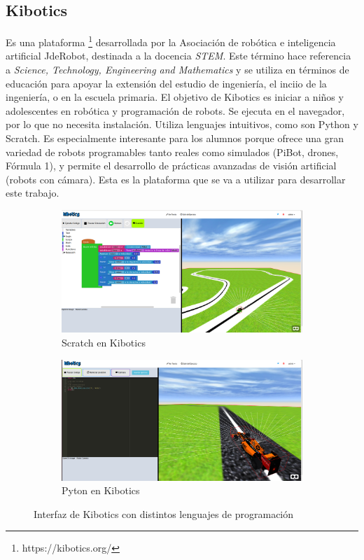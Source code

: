 \documentclass{report}
\begin{document}
\newpage
\subsection{Kibotics} 

Es una plataforma \footnote{https://kibotics.org/} desarrollada por la Asociación de robótica e inteligencia artificial JdeRobot, destinada a la docencia \textit{STEM}. Este término hace referencia a \textit{Science, Technology, Engineering and  Mathematics} y se utiliza en términos de educación para apoyar la extensión del estudio de ingeniería, el inciio de la ingeniería, o en la escuela primaria. El objetivo de Kibotics es iniciar a niños y adolescentes en robótica y programación de robots. Se ejecuta en el navegador, por lo que no necesita instalación. Utiliza lenguajes intuitivos, como son Python y Scratch. Es especialmente interesante para los alumnos porque ofrece una gran variedad de robots programables tanto reales como simulados (PiBot, drones, Fórmula 1), y permite el desarrollo de prácticas avanzadas de visión artificial (robots con cámara). Esta es la plataforma que se va a utilizar para desarrollar este trabajo.

\renewcommand{\figurename}{Figura}
\begin{figure}[h]
\centering
	\begin{subfigure}[h]{\textwidth}
	\centering
	 \includegraphics[scale=0.15]{images/scratch+websim.png}
	 \caption{Scratch en Kibotics}
	\end{subfigure}
	\begin{subfigure}[h]{\textwidth}
	\centering
	 \includegraphics[scale=0.15]{images/python+websim.png}
	 \caption{Pyton en Kibotics}
	\end{subfigure}
	\caption{Interfaz de Kibotics con distintos lenguajes de programación}
\end{figure}
\end{document}
